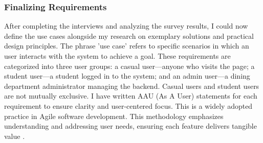 \documentclass[10pt,twocolumn]{article}
\begin{document}
\subsubsection{Finalizing Requirements}
After completing the interviews and analyzing the survey results, I could now define the use cases alongside my research on exemplary solutions and practical design principles. The phrase 'use case' refers to specific scenarios in which an user interacts with the system to achieve a goal. These requirements are categorized into three user groups: a casual user—anyone who visits the page; a student user—a student logged in to the system; and an admin user—a dining department administrator managing the backend. Casual users and student users are not mutually exclusive. 
I have written AAU (As A User) statements for each requirement to ensure clarity and user-centered focus. This is a widely adopted practice in Agile software development. This methodology emphasizes understanding and addressing user needs, ensuring each feature delivers tangible value \cite{AAU}. 
\end{document}
